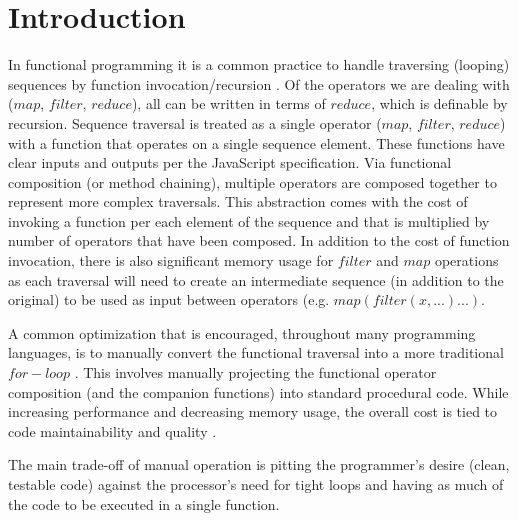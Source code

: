 \chapter{Introduction}
In functional programming it is a common practice to handle traversing (looping) sequences by function invocation/recursion \cite{recurse16}.  Of the operators we are dealing with ($map$, $filter$, $reduce$), all can be written in terms of $reduce$, which is definable by recursion. Sequence traversal is treated as a single operator ($map$, $filter$, $reduce$) with a function that operates on a single sequence element. These functions have clear inputs and outputs per the JavaScript specification.  Via functional composition (or method chaining), multiple operators are composed together to represent more complex traversals.  This abstraction comes with the cost of invoking a function per each element of the sequence and that is multiplied by number of operators that have been composed. In addition to the cost of function invocation, there is also significant memory usage for $filter$ and $map$ operations as each traversal will need to create an intermediate sequence (in addition to the original) to be used as input between operators (e.g. $map(filter(x, ...)...)$.  

A common optimization that is encouraged, throughout many programming languages, is to manually convert the functional traversal into a more traditional $for-loop$ \cite{iterperf09} \cite{iterperf10} \cite{iterperf11}.  This involves manually projecting the functional operator composition (and the companion functions) into standard procedural code.  While increasing performance and decreasing memory usage, the overall cost is tied to code maintainability and quality \cite{langstudy14}.  

The main trade-off of manual operation is pitting the programmer's desire (clean, testable code) against the processor's need for tight loops and having as much of the code to be executed in a single function.  